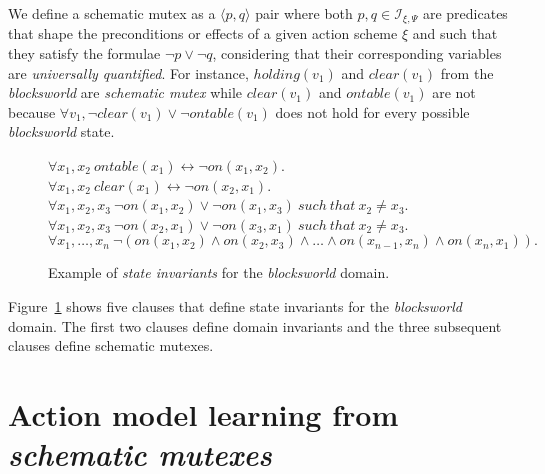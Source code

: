 \documentclass{article}
\newcommand{\tup}[1]{{\langle #1 \rangle}}
\begin{document}

We define a schematic mutex as a $\tup{p,q}$ pair where both $p,q\in{\mathcal I}_{\xi,\Psi}$ are predicates that shape the preconditions or effects of a given action scheme $\xi$ and such that they satisfy the formulae $\neg p\vee \neg q$, considering that their corresponding variables are {\em universally quantified}. For instance, $holding(v_1)$ and $clear(v_1)$ from the {\em blocksworld} are {\em schematic mutex} while $clear(v_1)$ and $ontable(v_1)$ are not because $\forall v_1, \neg clear(v_1)\vee\neg ontable(v_1)$ does not hold for every possible {\em blocksworld} state.

\begin{figure}[hbt!]
  \begin{footnotesize}
$\forall x_1,x_2\ ontable(x_1)\leftrightarrow\neg on(x_1,x_2)$.\\
$\forall x_1,x_2\ clear(x_1)\leftrightarrow\neg on(x_2,x_1)$.\\
$\forall x_1,x_2,x_3\ \neg on(x_1,x_2)\vee\neg on(x_1,x_3)\ such\ that\ x_2\neq x_3$.\\
$\forall x_1,x_2,x_3\ \neg on(x_2,x_1)\vee\neg on(x_3,x_1)\ such\ that\ x_2\neq x_3$.\\
$\forall x_1,\ldots,x_n\ \neg(on(x_1,x_2)\wedge on(x_2,x_3)\wedge\ldots\wedge on(x_{n-1},x_n)\wedge on(x_n,x_1)).$
\end{footnotesize}
 \caption{\small Example of {\em state invariants} for the {\em blocksworld} domain.}
\label{fig:strongest-invariant}
\end{figure}


Figure~\ref{fig:strongest-invariant} shows five clauses that define state invariants for the {\em blocksworld} domain. The first two clauses define domain invariants and the three subsequent clauses define schematic mutexes.


\section{Action model learning from {\em schematic mutexes}}
\label{sec:compilation}
\end{document}
